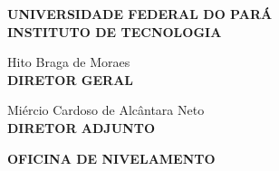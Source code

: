 \newpage
\thispagestyle{empty} %

\begin{flushleft}
    \textbf{UNIVERSIDADE FEDERAL DO PARÁ}\\
    \vspace{0.5cm}
    \textbf{INSTITUTO DE TECNOLOGIA} \\
    \vspace{0.5cm}
    
    Hito Braga de Moraes  \\
    \textbf{DIRETOR GERAL} \\
    \vspace{0.5cm}
    
    Miércio Cardoso de Alcântara Neto \\
    \textbf{DIRETOR ADJUNTO}
    \vspace{1cm}

    \begin{center}
        \textbf{OFICINA DE NIVELAMENTO \edicao} \\
        \vspace{0.5cm}
        \MakeUppercase{\eixo} \\
        \vspace{1cm}
        
        \vspace{0.5cm}
    \end{center}
\end{flushleft}

\begin{flushleft}
    \justify
    \descricaoEixo
\end{flushleft}

\newpage